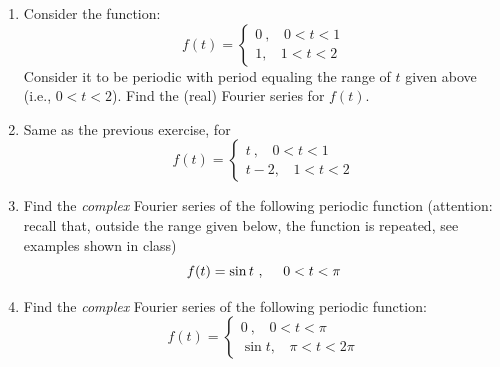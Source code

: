 \documentclass[fleqn]{article}
\begin{document}
  \begin{enumerate}
    \item Consider the function:
    \begin{equation}
      f(t)=\begin{cases}
      0~, ~~~~0< t < 1 \\
      1, ~~~~1< t< 2 
      \end{cases}
    \end{equation}
    Consider it to be periodic with period equaling the range of $t$ given above (i.e., $0<t<2$). Find the (real) Fourier series for $f(t)$. 
    
    \item Same as the previous exercise, for 
    \begin{equation}
      f(t)=\begin{cases}
      t~, ~~~~0< t < 1 \\
      t-2, ~~~~1< t< 2 
      \end{cases}
    \end{equation}


    \item Find the \emph{complex} Fourier series of the following periodic function (attention: recall that, outside the range given below, the function is repeated, see examples shown in class)
      \begin{equation}
      f(t)=\sin t~, ~~~~0< t < \pi \\
      \end{equation}

    \item Find the \emph{complex} Fourier series of the following periodic function: 
    \begin{equation}
      f(t)=\begin{cases}
      0~, ~~~~0< t < \pi \\
      \sin t, ~~~~\pi< t< 2 \pi
      \end{cases}
    \end{equation}


  \end{enumerate}
\end{document}
